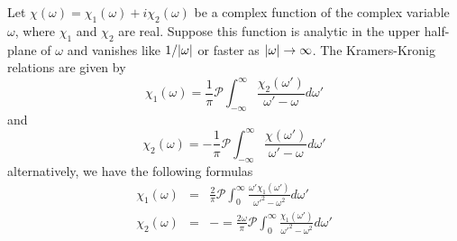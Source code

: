 Let $\chi(\omega) = \chi_1(\omega) + i \chi_2(\omega)$ be a complex function of the complex variable $\omega$, where $\chi_1$ and $\chi_2$ are real.
Suppose this function is analytic in the upper half-plane of $\omega$ and vanishes like $1/\abs{\omega}$ or faster as $\abs{\omega}\to \infty$.
The Kramers-Kronig relations are given by
\begin{equation*}
  \chi_1(\omega) = \frac{1}{\pi} \mathcal{P}\int_{-\infty}^\infty \frac{\chi_2(\omega')}{\omega'-\omega} d\omega'
\end{equation*}
and
\begin{equation*}
  \chi_2(\omega) = -\frac{1}{\pi} \mathcal{P} \int_{-\infty}^\infty \frac{\chi(\omega')}{\omega'-\omega} d\omega'
\end{equation*}
alternatively, we have the following formulas
\begin{eqnarray*}
    \chi_1(\omega) &=& \frac{2}{\pi} \mathcal{P} \int_0^\infty \frac{\omega' \chi_1(\omega')}{\omega'^2-\omega^2} d\omega' \\
    \chi_2(\omega) &=& -=\frac{2\omega}{\pi} \mathcal{P} \int_0^\infty \frac{\chi_1(\omega')}{\omega'^2 -\omega^2} d\omega'
\end{eqnarray*}
